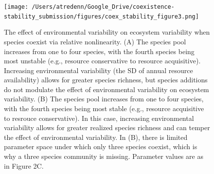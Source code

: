 \documentclass[12pt,]{article}
\begin{document}
\newpage{}

\begin{figure}[!ht]
  \centering
      \texttt{[image: /Users/atredenn/Google\_Drive/coexistence-stability\_submission/figures/coex\_stability\_figure3.png]}
  \caption{The effect of environmental variability on ecosystem variability when species coexist via relative nonlinearity. (A) The species pool increases from one to four species, with the fourth species being most unstable (e.g., resource conservative to resource acquisitive). Increasing environmental variability (the SD of annual resource availability) allows for greater species richness, but species additions do not modulate the effect of environmental variability on ecosystem variability. (B) The species pool increases from one to four species, with the fourth species being most stable (e.g., resource acquisitive to resrouce conservative). In this case, increasing environmental variability allows for greater realized species richness and can temper the effect of environmental variability. In (B), there is limited parameter space under which only three species coexist, which is why a three species community is missing. Parameter values are as in Figure 2C.}
\end{figure}

\newpage{}
\end{document}
